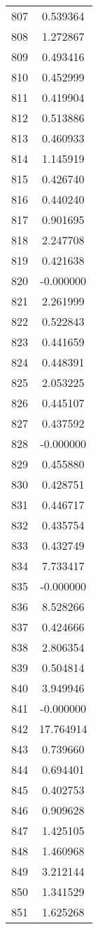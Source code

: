 \documentclass[12pt]{article}
\begin{document}
\begin{longtable}{@{}cc@{}}
807 & 0.539364 \\
808 & 1.272867 \\
809 & 0.493416 \\
810 & 0.452999 \\
811 & 0.419904 \\
812 & 0.513886 \\
813 & 0.460933 \\
814 & 1.145919 \\
815 & 0.426740 \\
816 & 0.440240 \\
817 & 0.901695 \\
818 & 2.247708 \\
819 & 0.421638 \\
820 & -0.000000 \\
821 & 2.261999 \\
822 & 0.522843 \\
823 & 0.441659 \\
824 & 0.448391 \\
825 & 2.053225 \\
826 & 0.445107 \\
827 & 0.437592 \\
828 & -0.000000 \\
829 & 0.455880 \\
830 & 0.428751 \\
831 & 0.446717 \\
832 & 0.435754 \\
833 & 0.432749 \\
834 & 7.733417 \\
835 & -0.000000 \\
836 & 8.528266 \\
837 & 0.424666 \\
838 & 2.806354 \\
839 & 0.504814 \\
840 & 3.949946 \\
841 & -0.000000 \\
842 & 17.764914 \\
843 & 0.739660 \\
844 & 0.694401 \\
845 & 0.402753 \\
846 & 0.909628 \\
847 & 1.425105 \\
848 & 1.460968 \\
849 & 3.212144 \\
850 & 1.341529 \\
851 & 1.625268 \\

\end{longtable}
\end{document}
